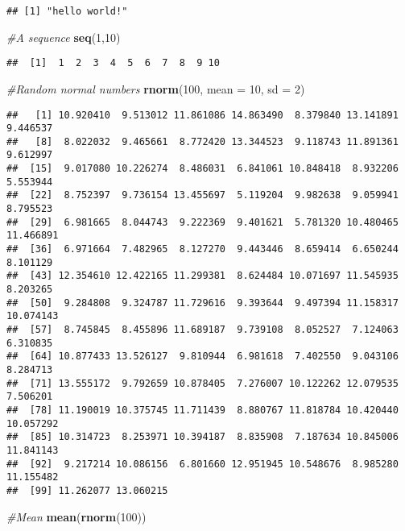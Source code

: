 \documentclass[]{article}
\newenvironment{Shaded}{\begin{snugshade}}{\end{snugshade}}
\newcommand{\CommentTok}[1]{\textcolor[rgb]{0.56,0.35,0.01}{\textit{#1}}}
\newcommand{\DataTypeTok}[1]{\textcolor[rgb]{0.13,0.29,0.53}{#1}}
\newcommand{\DecValTok}[1]{\textcolor[rgb]{0.00,0.00,0.81}{#1}}
\newcommand{\KeywordTok}[1]{\textcolor[rgb]{0.13,0.29,0.53}{\textbf{#1}}}
\newcommand{\NormalTok}[1]{#1}
\begin{document}
\begin{verbatim}
## [1] "hello world!"
\end{verbatim}

\begin{Shaded}
\begin{Highlighting}[]
\CommentTok{#A sequence}
\KeywordTok{seq}\NormalTok{(}\DecValTok{1}\NormalTok{,}\DecValTok{10}\NormalTok{)}
\end{Highlighting}
\end{Shaded}

\begin{verbatim}
##  [1]  1  2  3  4  5  6  7  8  9 10
\end{verbatim}

\begin{Shaded}
\begin{Highlighting}[]
\CommentTok{#Random normal numbers}
\KeywordTok{rnorm}\NormalTok{(}\DecValTok{100}\NormalTok{, }\DataTypeTok{mean =} \DecValTok{10}\NormalTok{, }\DataTypeTok{sd =} \DecValTok{2}\NormalTok{)}
\end{Highlighting}
\end{Shaded}

\begin{verbatim}
##   [1] 10.920410  9.513012 11.861086 14.863490  8.379840 13.141891  9.446537
##   [8]  8.022032  9.465661  8.772420 13.344523  9.118743 11.891361  9.612997
##  [15]  9.017080 10.226274  8.486031  6.841061 10.848418  8.932206  5.553944
##  [22]  8.752397  9.736154 13.455697  5.119204  9.982638  9.059941  8.795523
##  [29]  6.981665  8.044743  9.222369  9.401621  5.781320 10.480465 11.466891
##  [36]  6.971664  7.482965  8.127270  9.443446  8.659414  6.650244  8.101129
##  [43] 12.354610 12.422165 11.299381  8.624484 10.071697 11.545935  8.203265
##  [50]  9.284808  9.324787 11.729616  9.393644  9.497394 11.158317 10.074143
##  [57]  8.745845  8.455896 11.689187  9.739108  8.052527  7.124063  6.310835
##  [64] 10.877433 13.526127  9.810944  6.981618  7.402550  9.043106  8.284713
##  [71] 13.555172  9.792659 10.878405  7.276007 10.122262 12.079535  7.506201
##  [78] 11.190019 10.375745 11.711439  8.880767 11.818784 10.420440 10.057292
##  [85] 10.314723  8.253971 10.394187  8.835908  7.187634 10.845006 11.841143
##  [92]  9.217214 10.086156  6.801660 12.951945 10.548676  8.985280 11.155482
##  [99] 11.262077 13.060215
\end{verbatim}

\begin{Shaded}
\begin{Highlighting}[]
\CommentTok{#Mean}
\KeywordTok{mean}\NormalTok{(}\KeywordTok{rnorm}\NormalTok{(}\DecValTok{100}\NormalTok{))}
\end{Highlighting}
\end{Shaded}
\end{document}
